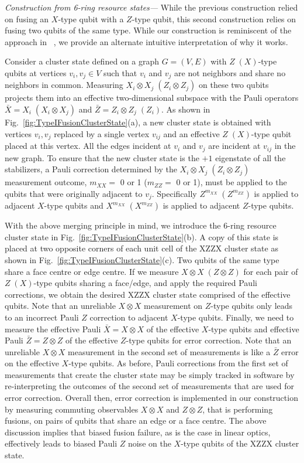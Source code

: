 \documentclass[reprint,
groupedaddress,
 prl,amsmath,amssymb,
 aps]{revtex4-2}
\theoremstyle{definition}
\begin{document}
\begin{bibunit}
{\it Construction from 6-ring resource states---} While the previous construction relied on fusing an $X$-type qubit with a $Z$-type qubit, this second construction relies on fusing two qubits of the same type. While our construction is reminiscent of the approach in ~\cite{bartolucci2021fusion}, we provide an alternate intuitive interpretation of why it works. 


Consider a cluster state defined on a graph $G=(V,E)$ with $Z\; (X)$-type qubits at vertices $v_i,v_j\in V$ such that $v_i$ and $v_j$ are not neighbors and share no neighbors in common. Measuring $X_i\otimes X_j\; (Z_i\otimes Z_j)$ on these two qubits projects them into an effective two-dimensional subspace with the Pauli operators $\bar{X}=X_i\; (X_i\otimes X_j)$ and $\bar{Z}=Z_i\otimes Z_j\; (Z_i)$. As shown in Fig.~\ref{fig:TypeIFusionClusterState}(a), a new cluster state is obtained with vertices $v_i,v_j$ replaced by a single vertex $v_{ij}$ and an effective $Z\; (X)$-type qubit placed at this vertex. All the edges incident at $v_i$ and $v_j$ are incident at $v_{ij}$ in the new graph. To ensure that the new cluster state is the $+1$ eigenstate of all the stabilizers, a Pauli correction determined by the $X_i\otimes X_j\; (Z_i\otimes Z_j) $ measurement outcome, {{$m_{XX}=$ 0 or 1 ($m_{ZZ}=$ 0 or 1)}}, must be applied to the qubits that were originally adjacent to $v_j$. Specifically $Z^{m_{XX}}\; (Z^{m_{ZZ}})$ is applied to adjacent $X$-type qubits and $X^{m_{XX}}\; (X^{m_{ZZ}})$ is applied to adjacent $Z$-type qubits. 

With the above merging principle in mind, we introduce the 6-ring resource cluster state in Fig.~\ref{fig:TypeIFusionClusterState}(b). 
A copy of this state is placed at {two} opposite corners of each unit cell of the XZZX cluster state as shown in Fig.~\ref{fig:TypeIFusionClusterState}(c). Two qubits of the same type share a face centre or edge {centre}. If we measure $X\otimes X\; (Z\otimes Z)$ for each pair of $Z\; (X)$-type qubits sharing a face/edge, and apply the required Pauli corrections, we obtain the desired XZZX cluster state comprised of the effective qubits. Note that an unreliable $X\otimes X$ measurement on $Z$-type qubits only leads to an incorrect Pauli $Z$ correction to adjacent $X$-type qubits. Finally, we need to measure the effective Pauli $\bar{X}=X\otimes X$ of the effective $X$-type qubits and effective Pauli $\bar{Z}=Z\otimes Z$ of the effective $Z$-type qubits for error correction. Note that an unreliable $X\otimes X$ measurement in the second set of measurements is like a $\bar{Z}$ error on the effective $X$-type qubits. As before, Pauli corrections from the first set of measurements that create the cluster state may be simply tracked in software by re-interpreting the outcomes of the second set of measurements that are used for error correction. Overall then, error correction is implemented in our construction by measuring commuting observables $X\otimes X$ and $Z\otimes Z$, that is performing fusions, on pairs of qubits that share an edge or a face {centre}. The above discussion implies that biased fusion failure, as is the case in linear optics, effectively leads to biased Pauli $Z$ noise on the $X$-type qubits of the XZZX cluster state.



\end{bibunit}
\end{document}
